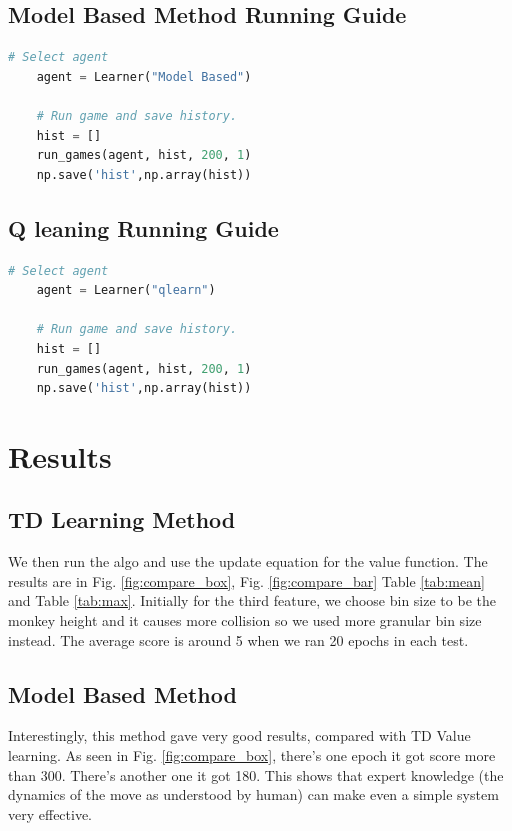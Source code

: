 \documentclass[submit]{harvardml}
\begin{document}
\subsection{Model Based Method Running Guide}
\begin{lstlisting}[language=python]
    # Select agent
    agent = Learner("Model Based")

    # Run game and save history.
    hist = []
    run_games(agent, hist, 200, 1)
    np.save('hist',np.array(hist))
\end{lstlisting}

\subsection{Q leaning Running Guide}
\begin{lstlisting}[language=python]
    # Select agent
    agent = Learner("qlearn")

    # Run game and save history.
    hist = []
    run_games(agent, hist, 200, 1)
    np.save('hist',np.array(hist))
\end{lstlisting}

\section{Results}

\subsection{TD Learning Method}

We then run the algo and use the update equation for the value function. The results are in Fig. \ref{fig:compare_box}, Fig. \ref{fig:compare_bar} Table \ref{tab:mean} and Table \ref{tab:max}. Initially for the third feature, we choose bin size to be the monkey height and it causes more collision so we used more granular bin size instead. The average score is around 5 when we ran 20 epochs in each test.

\subsection{Model Based Method}
Interestingly, this method gave very good results, compared with TD Value learning. As seen in Fig. \ref{fig:compare_box}, there's one epoch it got score more than 300. There's another one it got 180. This shows that expert knowledge (the dynamics of the move as understood by human) can make even a simple system very effective.  
\end{document}
